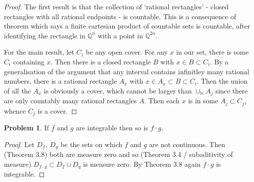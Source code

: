 \documentclass[20pt]{article}
\theoremstyle{plain}
\theoremstyle{definition}
\newtheorem*{problem}{Problem}
\newcommand{\rationals}{\mathbb{Q}}
\newcommand{\naturals}{\mathbb{N}}
\begin{document}
\begin{proof}
  The first result is that the collection of `rational rectangles' - closed rectangles 
  with all rational endpoints - is countable. This is a consequence of theorem which says
  a finite cartesian product of countable sets is countable, after identifying the rectangle 
  in $\rationals^n$ with a point in $\rationals^{2n}$.

  For the main result, let $C_i$ be any open cover. For any $x$ in our set, 
  there is some $C_i$ containing $x$.  Then there is a closed rectangle $B$ with
  $x \in B \subset C_i$.  By a generalisation of the argument that any interval contains 
  infinitley many rational numbers, there is a rational rectangle $A_x$ with 
  $x \in A_x \subset B \subset C_i.$
  Then the union of all the $A_x$ is obviously a cover, which cannot be larger than $\cup_\naturals A_j$ since there are only countably many rational rectangles $A$.
  Then each $x$ is in some $A_j \subset C_j$, whence $C_j$ is a cover.
\end{proof}



























































\begin{problem}{3.14}
  If $f$ and $g$ are integrable then so is $f\cdot g$.
\end{problem}

\begin{proof}
  Let $D_f,\ D_g$ be the sets on which $f$ and $g$ are not continuous.
  Then (Theorem 3.8) both are measure zero and so (Theorem 3.4 / subaditivity of measure)
  $D_{f\cdot g} \subset D_f \cup D_g$ is measure zero.
  By Theorem 3.8 again $f \cdot g$ is integrable.
\end{proof}
\end{document}
